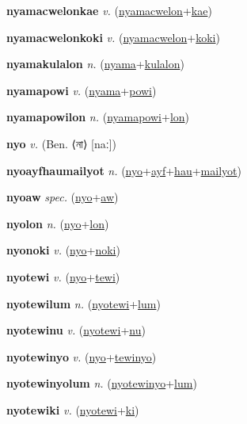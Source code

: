 \textbf{\hypertarget{nyamacwelonkae}{nyamacwelonkae}} \textit{v.} (\hyperlink{nyamacwelon}{nyamacwelon}+\allowbreak \hyperlink{kae}{kae})


\textbf{\hypertarget{nyamacwelonkoki}{nyamacwelonkoki}} \textit{v.} (\hyperlink{nyamacwelon}{nyamacwelon}+\allowbreak \hyperlink{koki}{koki})


\textbf{\hypertarget{nyamakulalon}{nyamakulalon}} \textit{n.} (\hyperlink{nyama}{nyama}+\allowbreak \hyperlink{kulalon}{kulalon})


\textbf{\hypertarget{nyamapowi}{nyamapowi}} \textit{v.} (\hyperlink{nyama}{nyama}+\allowbreak \hyperlink{powi}{powi})


\textbf{\hypertarget{nyamapowilon}{nyamapowilon}} \textit{n.} (\hyperlink{nyamapowi}{nyamapowi}+\allowbreak \hyperlink{lon}{lon})


\textbf{\hypertarget{nyo}{nyo}} \textit{v.} (Ben. ⟨{\bengali{}না}⟩ [naː])


\textbf{\hypertarget{nyoayfhaumailyot}{nyoayfhaumailyot}} \textit{n.} (\hyperlink{nyo}{nyo}+\allowbreak \hyperlink{ayf}{ayf}+\allowbreak \hyperlink{hau}{hau}+\allowbreak \hyperlink{mailyot}{mailyot})


\textbf{\hypertarget{nyoaw}{nyoaw}} \textit{spec.} (\hyperlink{nyo}{nyo}+\allowbreak \hyperlink{aw}{aw})


\textbf{\hypertarget{nyolon}{nyolon}} \textit{n.} (\hyperlink{nyo}{nyo}+\allowbreak \hyperlink{lon}{lon})


\textbf{\hypertarget{nyonoki}{nyonoki}} \textit{v.} (\hyperlink{nyo}{nyo}+\allowbreak \hyperlink{noki}{noki})


\textbf{\hypertarget{nyotewi}{nyotewi}} \textit{v.} (\hyperlink{nyo}{nyo}+\allowbreak \hyperlink{tewi}{tewi})


\textbf{\hypertarget{nyotewilum}{nyotewilum}} \textit{n.} (\hyperlink{nyotewi}{nyotewi}+\allowbreak \hyperlink{lum}{lum})


\textbf{\hypertarget{nyotewinu}{nyotewinu}} \textit{v.} (\hyperlink{nyotewi}{nyotewi}+\allowbreak \hyperlink{nu}{nu})


\textbf{\hypertarget{nyotewinyo}{nyotewinyo}} \textit{v.} (\hyperlink{nyo}{nyo}+\allowbreak \hyperlink{tewinyo}{tewinyo})


\textbf{\hypertarget{nyotewinyolum}{nyotewinyolum}} \textit{n.} (\hyperlink{nyotewinyo}{nyotewinyo}+\allowbreak \hyperlink{lum}{lum})


\textbf{\hypertarget{nyotewiki}{nyotewiki}} \textit{v.} (\hyperlink{nyotewi}{nyotewi}+\allowbreak \hyperlink{ki}{ki})


